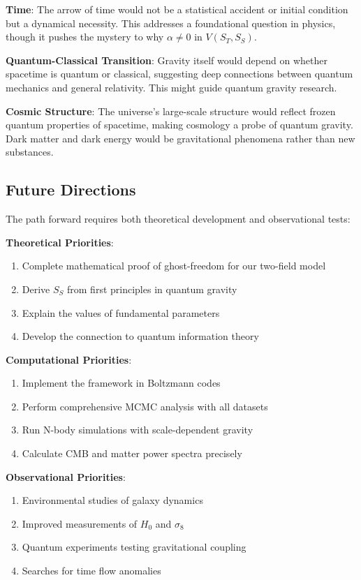 \documentclass[12pt]{article}
\begin{document}
\textbf{Time}: The arrow of time would not be a statistical accident or initial condition but a dynamical necessity. This addresses a foundational question in physics, though it pushes the mystery to why $\alpha \neq 0$ in $V(S_T, S_S)$.

\textbf{Quantum-Classical Transition}: Gravity itself would depend on whether spacetime is quantum or classical, suggesting deep connections between quantum mechanics and general relativity. This might guide quantum gravity research.

\textbf{Cosmic Structure}: The universe's large-scale structure would reflect frozen quantum properties of spacetime, making cosmology a probe of quantum gravity. Dark matter and dark energy would be gravitational phenomena rather than new substances.

\subsection{Future Directions}

The path forward requires both theoretical development and observational tests:

\textbf{Theoretical Priorities}:
\begin{enumerate}
    \item Complete mathematical proof of ghost-freedom for our two-field model
    \item Derive $S_S$ from first principles in quantum gravity
    \item Explain the values of fundamental parameters
    \item Develop the connection to quantum information theory
\end{enumerate}

\textbf{Computational Priorities}:
\begin{enumerate}
    \item Implement the framework in Boltzmann codes
    \item Perform comprehensive MCMC analysis with all datasets
    \item Run N-body simulations with scale-dependent gravity
    \item Calculate CMB and matter power spectra precisely
\end{enumerate}

\textbf{Observational Priorities}:
\begin{enumerate}
    \item Environmental studies of galaxy dynamics
    \item Improved measurements of $H_0$ and $\sigma_8$
    \item Quantum experiments testing gravitational coupling
    \item Searches for time flow anomalies
\end{enumerate}
\end{document}
